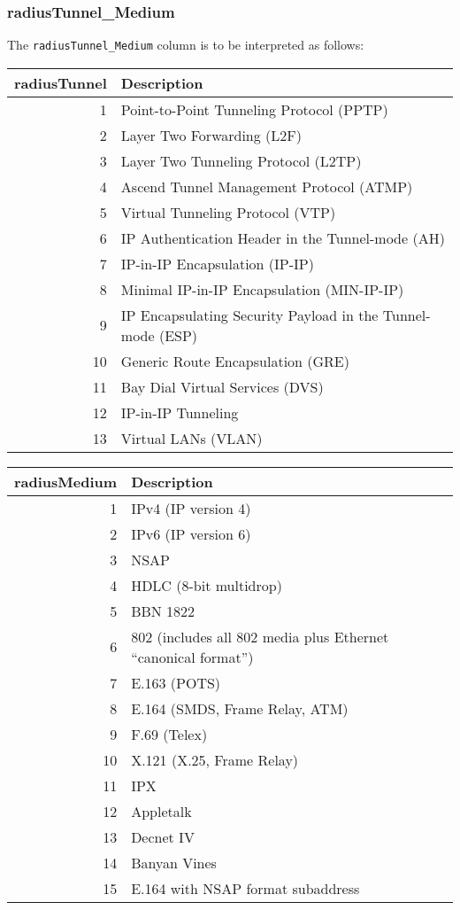 \documentclass[documentation]{subfiles}
\begin{document}
\subsubsection{radiusTunnel\_Medium}\label{radiusTunnelMedium}
The {\tt radiusTunnel\_Medium} column is to be interpreted as follows:
\begin{longtable}{rl}
    \toprule
    {\bf radiusTunnel} & {\bf Description}\\
    \midrule\endhead%
     1 & Point-to-Point Tunneling Protocol (PPTP)\\
     2 & Layer Two Forwarding (L2F)\\
     3 & Layer Two Tunneling Protocol (L2TP)\\
     4 & Ascend Tunnel Management Protocol (ATMP)\\
     5 & Virtual Tunneling Protocol (VTP)\\
     6 & IP Authentication Header in the Tunnel-mode (AH)\\
     7 & IP-in-IP Encapsulation (IP-IP)\\
     8 & Minimal IP-in-IP Encapsulation (MIN-IP-IP)\\
     9 & IP Encapsulating Security Payload in the Tunnel-mode (ESP)\\
    10 & Generic Route Encapsulation (GRE)\\
    11 & Bay Dial Virtual Services (DVS)\\
    12 & IP-in-IP Tunneling\\
    13 & Virtual LANs (VLAN)\\
    \bottomrule
\end{longtable}

\begin{longtable}{rl}
    \toprule
    {\bf radiusMedium} & {\bf Description}\\
    \midrule\endhead%
     1 & IPv4 (IP version 4)\\
     2 & IPv6 (IP version 6)\\
     3 & NSAP\\
     4 & HDLC (8-bit multidrop)\\
     5 & BBN 1822\\
     6 & 802 (includes all 802 media plus Ethernet ``canonical format'')\\
     7 & E.163 (POTS)\\
     8 & E.164 (SMDS, Frame Relay, ATM)\\
     9 & F.69 (Telex)\\
    10 & X.121 (X.25, Frame Relay)\\
    11 & IPX\\
    12 & Appletalk\\
    13 & Decnet IV\\
    14 & Banyan Vines\\
    15 & E.164 with NSAP format subaddress\\
    \bottomrule
\end{longtable}
\end{document}
